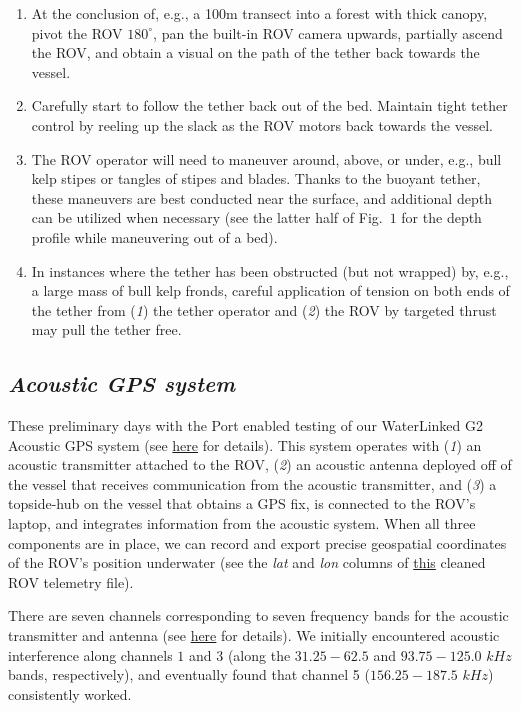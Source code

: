 \documentclass[11pt]{article}
\begin{document}
\begin{enumerate}
\item
At the conclusion of, e.g., a 100m transect into a forest with thick 
canopy, pivot the ROV $180^\circ$, pan the built-in ROV camera upwards, 
partially ascend the ROV, and obtain a visual on the path of the tether 
back towards the vessel. 
\item
Carefully start to follow the tether back out of the bed. 
Maintain tight tether control by reeling up the slack as the ROV motors 
back towards the vessel. 
\item
The ROV operator will need to maneuver around, above, or under, e.g., 
bull kelp stipes or tangles of stipes and blades.
Thanks to the buoyant tether, these maneuvers are best conducted near the surface, and additional depth can be utilized when necessary (see the latter half of Fig.~$1$ for the depth profile while maneuvering out of a bed).
\item
In instances where the tether has been obstructed (but not wrapped) by, 
e.g., a large mass of bull kelp fronds, careful application of tension 
on both ends of the tether from (\textit{1}) the tether operator and (\textit{2}) the ROV by targeted thrust may pull the tether free. 
\end{enumerate} 

\subsection{\textit{Acoustic GPS system}}
These preliminary days with the Port enabled testing of our WaterLinked 
G2 Acoustic GPS system (see 
\href{https://waterlinked.github.io/underwater-gps/introduction/}{here} 
for details). 
This system operates with 
(\textit{1}) an acoustic transmitter attached to the ROV, 
(\textit{2}) an acoustic antenna deployed off of the vessel that 
receives communication from the acoustic transmitter, and 
(\textit{3}) a topside-hub on the vessel that obtains a GPS fix, is connected to the ROV's laptop, and integrates information from the acoustic system. 
When all three components are in place, we can record and export 
precise geospatial coordinates of the ROV's position underwater (see 
the \textit{lat} and \textit{lon} columns of 
\href{https://github.com/zhrandell/Seattle_Aquarium_ROV_telemetry_imagery_analysis/blob/15b0c253a3292df240f1559ae9e0f73d25d6be66/ROV_telemetry/Cleaned/2022-08-15_11-57-51.csv}{this}
 cleaned ROV telemetry file). 

There are seven channels corresponding to seven frequency bands for 
the acoustic transmitter and antenna (see 
\href{https://waterlinked.github.io/underwater-gps/gui/settings/}{here} 
for details).
We initially encountered acoustic interference along channels $1$ and 
$3$ (along the $31.25-62.5$ and $93.75-125.0$ $kHz$ bands, 
respectively), and eventually found that channel 5 ($156.25-187.5$ 
$kHz$) consistently worked. 
 
\end{document}
